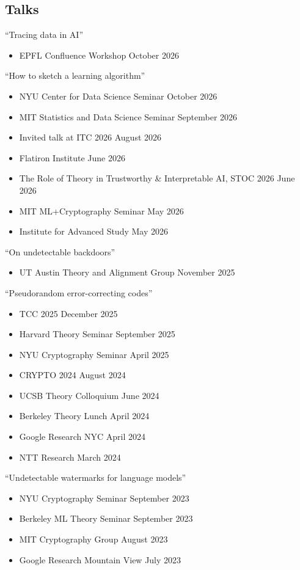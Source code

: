 \documentclass[line,margin]{res}
\begin{document}
\begin{resume}
\section{Talks}
``Tracing data in AI''
\begin{itemize}
  \item EPFL Confluence Workshop \hfill October 2026
\end{itemize}

``How to sketch a learning algorithm''
\begin{itemize}
  \item NYU Center for Data Science Seminar \hfill October 2026
  \item MIT Statistics and Data Science Seminar \hfill September 2026
  \item Invited talk at ITC 2026 \hfill August 2026
  \item Flatiron Institute \hfill June 2026
  \item The Role of Theory in Trustworthy \& Interpretable AI, STOC 2026 \hfill June 2026
  \item MIT ML+Cryptography Seminar \hfill May 2026
  \item Institute for Advanced Study \hfill May 2026
\end{itemize}

``On undetectable backdoors''
\begin{itemize}
  \item UT Austin Theory and Alignment Group \hfill November 2025
\end{itemize}

``Pseudorandom error-correcting codes''
\begin{itemize}
  \item TCC 2025 \hfill December 2025
  \item Harvard Theory Seminar \hfill September 2025
  \item NYU Cryptography Seminar \hfill April 2025
  \item CRYPTO 2024 \hfill August 2024
  \item UCSB Theory Colloquium \hfill June 2024
  \item Berkeley Theory Lunch \hfill April 2024
  \item Google Research NYC \hfill April 2024
  \item NTT Research \hfill March 2024
\end{itemize}

``Undetectable watermarks for language models''
\begin{itemize}
  \item NYU Cryptography Seminar \hfill September 2023
  \item Berkeley ML Theory Seminar \hfill September 2023
  \item MIT Cryptography Group \hfill August 2023
  \item Google Research Mountain View \hfill July 2023
\end{itemize}


\end{resume}
\end{document}
